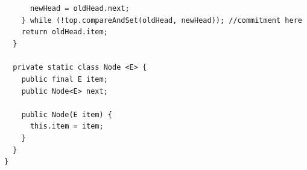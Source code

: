 \documentclass{article}
\begin{document}
\lstinline|      newHead = oldHead.next;|\\
\lstinline|    } while (!top.compareAndSet(oldHead, newHead)); //commitment here|\\
\lstinline|    return oldHead.item;|\\
\lstinline|  }|\\\\
\lstinline|  private static class Node <E> {|\\
\lstinline|    public final E item;|\\
\lstinline|    public Node<E> next;|\\\\
\lstinline|    public Node(E item) {|\\
\lstinline|      this.item = item;|\\
\lstinline|    }|\\
\lstinline|  }|\\
\lstinline|}|
\end{document}
